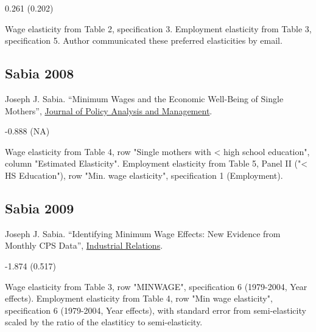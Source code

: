 \vspace{0.7em}

 0.261 (0.202)

\vspace{0.7em}

 Wage elasticity from Table 2, specification 3. Employment elasticity from Table 3, specification 5. Author communicated these preferred elasticities by email.

\subsection*{Sabia 2008}
\vspace{-0.7em}

\noindent Joseph J. Sabia. ``Minimum Wages and the Economic Well-Being of Single Mothers'', \href{https://doi.org/10.1002/pam.20379}{Journal of Policy Analysis and Management}.

\vspace{0.7em}

 -0.888 (NA)

\vspace{0.7em}

 Wage elasticity from Table 4, row "Single mothers with < high school education", column "Estimated Elasticity". Employment elasticity from Table 5, Panel II ("< HS Education"), row "Min. wage elasticity", specification 1 (Employment).

\subsection*{Sabia 2009}
\vspace{-0.7em}

\noindent Joseph J. Sabia. ``Identifying Minimum Wage Effects: New Evidence from Monthly CPS Data'', \href{https://doi.org/10.1111/j.1468-232X.2009.00559.x}{Industrial Relations}.

\vspace{0.7em}

 -1.874 (0.517)

\vspace{0.7em}

 Wage elasticity from Table 3, row "MINWAGE", specification 6 (1979-2004, Year effects). Employment elasticity from Table 4, row "Min wage elasticity", specification 6 (1979-2004, Year effects), with standard error from semi-elasticity scaled by the ratio of the elastiticy to semi-elasticity.

